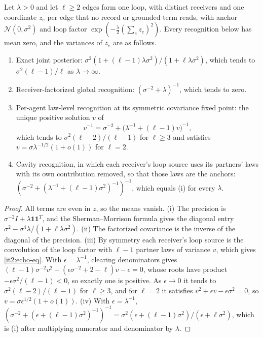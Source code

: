 \documentclass[11pt,letterpaper]{report}
\begin{document}
Let $\lambda>0$ and let $\ell\geq2$ edges form one loop, with distinct receivers and one coordinate $z_e$ per edge that no record or grounded term reads, with anchor $\mathcal N(0,\sigma^2)$ and loop factor $\exp(-\frac\lambda2(\sum_ez_e)^2)$. Every recognition below has mean zero, and the variances of $z_e$ are as follows.
\begin{enumerate}
\item[(i)] Exact joint posterior: $\sigma^2(1+(\ell-1)\lambda\sigma^2)/(1+\ell\lambda\sigma^2)$, which tends to $\sigma^2(\ell-1)/\ell$ as $\lambda\to\infty$.
\item[(ii)] Receiver-factorized global recognition: $(\sigma^{-2}+\lambda)^{-1}$, which tends to zero.
\item[(iii)] Per-agent law-level recognition at its symmetric covariance fixed point: the unique positive solution $v$ of
\begin{equation}
v^{-1}=\sigma^{-2}+\bigl(\lambda^{-1}+(\ell-1)v\bigr)^{-1},
\label{it2:echo-eq}
\end{equation}
which tends to $\sigma^2(\ell-2)/(\ell-1)$ for $\ell\geq3$ and satisfies $v=\sigma\lambda^{-1/2}(1+o(1))$ for $\ell=2$.
\item[(iv)] Cavity recognition, in which each receiver's loop source uses its partners' laws with its own contribution removed, so that those laws are the anchors: $(\sigma^{-2}+(\lambda^{-1}+(\ell-1)\sigma^2)^{-1})^{-1}$, which equals (i) for every $\lambda$.
\end{enumerate}
\begin{proof}
All terms are even in $z$, so the means vanish. (i) The precision is $\sigma^{-2}I+\lambda\mathbf 1\mathbf 1^T$, and the Sherman--Morrison formula gives the diagonal entry $\sigma^2-\sigma^4\lambda/(1+\ell\lambda\sigma^2)$. (ii) The factorized covariance is the inverse of the diagonal of the precision. (iii) By symmetry each receiver's loop source is the convolution of the loop factor with $\ell-1$ partner laws of variance $v$, which gives \cref{it2:echo-eq}. With $\epsilon=\lambda^{-1}$, clearing denominators gives $(\ell-1)\sigma^{-2}v^2+(\epsilon\sigma^{-2}+2-\ell)v-\epsilon=0$, whose roots have product $-\epsilon\sigma^2/(\ell-1)<0$, so exactly one is positive. As $\epsilon\to0$ it tends to $\sigma^2(\ell-2)/(\ell-1)$ for $\ell\geq3$, and for $\ell=2$ it satisfies $v^2+\epsilon v-\epsilon\sigma^2=0$, so $v=\sigma\epsilon^{1/2}(1+o(1))$. (iv) With $\epsilon=\lambda^{-1}$, $(\sigma^{-2}+(\epsilon+(\ell-1)\sigma^2)^{-1})^{-1}=\sigma^2(\epsilon+(\ell-1)\sigma^2)/(\epsilon+\ell\sigma^2)$, which is (i) after multiplying numerator and denominator by $\lambda$.
\end{proof}
\end{document}
